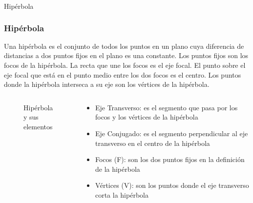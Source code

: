 \documentclass[xcolor={dvipsnames},aspectratio=169,10pt]{beamer}
\begin{document}
\begin{frame}{Hipérbola}
  \frametitle{Hipérbola}
    Una hipérbola es el conjunto de todos los puntos en un plano cuya diferencia de distancias a dos puntos fijos en el plano es una constante. 
    Los puntos fijos son los focos de la hipérbola. La recta que une los focos es el eje focal. El punto sobre el eje focal que está en el 
    punto medio entre los dos focos es el centro. Los puntos donde la hipérbola interseca a su eje son los vértices de la hipérbola.
    \begin{columns}
      \begin{column}{0.5\textwidth}
        \begin{figure}
          \caption{Hipérbola y sus elementos}
        \end{figure}
      \end{column}
      \begin{column}{0.5\textwidth}
        \begin{itemize}
          \item Eje Transverso: es el segmento que pasa por los focos y los vértices de la hipérbola
          \item Eje Conjugado: es el segmento perpendicular al eje transverso en el centro de la hipérbola
          \item Focos (F): son los dos puntos fijos en la definición de la hipérbola
          \item Vértices (V): son los puntos donde el eje transverso corta la hipérbola
        \end{itemize}
      \end{column}
    \end{columns}
\end{frame}
\end{document}
